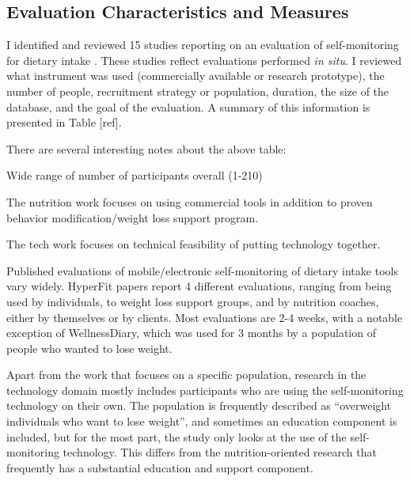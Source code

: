 \subsection{Evaluation Characteristics and Measures}
I identified and reviewed 15 studies reporting on an evaluation of self-monitoring for dietary intake \citep{glanz_improving_2006, burke_effect_2011,fukuo_development_2009,atienza_using_2008, yon_personal_2007, acharya_using_2011, arsand_usability_2007,jarvinen_hyperfit:_2008, mattila_mobile_2008, kozakai_dietary_2006, reddy_image_2007, silva_sapofitness:_2011, tsai_usability_2007, wang_development_2006, long_effectiveness_2012}. These studies reflect evaluations performed \textit{in situ}. I reviewed what instrument was used (commercially available or research prototype), the number of people, recruitment strategy or population, duration, the size of the database, and the goal of the evaluation. A summary of this information is presented in Table [ref].  



There are several interesting notes about the above table:
\begin{enumerate*}
\item Wide range of number of participants overall (1-210)
\item The nutrition work focuses on using commercial tools in addition to proven behavior modification/weight loss support program. 
\item The tech work focuses on technical feasibility of putting technology together. 
\item 

\end{enumerate*}

Published evaluations of mobile/electronic self-monitoring of dietary intake tools vary widely. HyperFit papers report 4 different evaluations, ranging from being used by individuals, to weight loss support groups, and by nutrition coaches, either by themselves or by clients. Most evaluations are 2-4 weeks, with a notable exception of WellnessDiary, which was used for 3 months by a population of people who wanted to lose weight. 

Apart from the work that focuses on a specific population, research in the technology domain mostly includes participants who are using the self-monitoring technology on their own. The population is frequently described as ``overweight individuals who want to lose weight'', and sometimes an education component is included, but for the most part, the study only looks at the use of the self-monitoring technology. This differs from the nutrition-oriented research that frequently has a substantial education and support component. 


